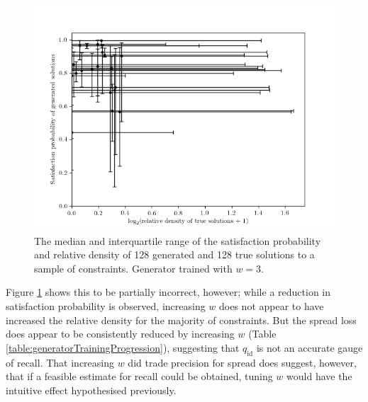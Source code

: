 \documentclass[../../main.tex]{subfiles}
\begin{document}
\begin{figure}[H]
    \begin{center}
    \includegraphics[width=\textwidth]{solutionPropertiesW3}
    \caption{
        The median and interquartile range of the satisfaction probability and relative density of 128 generated and 128 true solutions to a sample of constraints.
        Generator trained with $w=3$.
    }
    \label{fig:solutionPropertiesW3}
    \end{center}
\end{figure}
Figure \ref{fig:solutionPropertiesW3} shows this to be partially incorrect, however; while a reduction in satisfaction probability is observed, increasing $w$ does not appear to have increased the relative density for the majority of constraints.
But the spread loss does appear to be consistently reduced by increasing $w$ (Table \ref{table:generatorTrainingProgression}), suggesting that $q_\text{id}$ is not an accurate gauge of recall.
That increasing $w$ did trade precision for spread does suggest, however, that if a feasible estimate for recall could be obtained, tuning $w$ would have the intuitive effect hypothesised previously.
\end{document}
